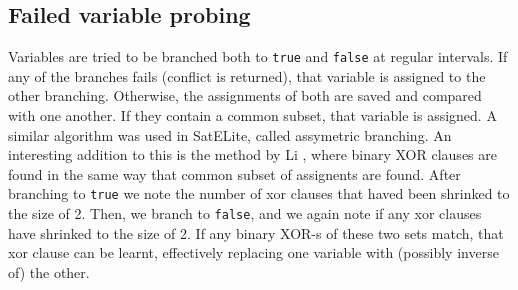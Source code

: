 \documentclass[final]{ieee}
\begin{document}
\subsection{Failed variable probing}
Variables are tried to be branched both to \texttt{true} and \texttt{false} at regular intervals. If any of the branches fails (conflict is returned), that variable is assigned to the other branching. Otherwise, the assignments of both are saved and compared with one another. If they contain a common subset, that variable is assigned. A similar algorithm was used in SatELite, called assymetric branching. An interesting addition to this is the method by Li \cite{DBLP:journals/dam/Li03}, where binary XOR clauses are found in the same way that common subset of assignents are found. After branching to \texttt{true} we note the number of xor clauses that haved been shrinked to the size of 2. Then, we branch to \texttt{false}, and we again note if any xor clauses have shrinked to the size of 2. If any binary XOR-s of these two sets match, that xor clause can be learnt, effectively replacing one variable with (possibly inverse of) the other.
 



\vfill
\pagebreak
\end{document}
